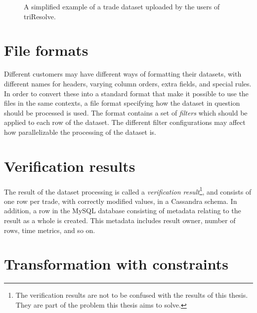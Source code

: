 \begin{figure}[ht]
\centering
{}
\caption[Example of trade dataset]{A simplified example of a trade dataset uploaded by the users of triResolve.}
  \label{fig:data_set_example}
\end{figure}

\section{File formats}
Different customers may have different ways of formatting their datasets, with different names for headers, varying column orders, extra fields,
and special rules. In order to convert these into a standard format that make it possible to use the files in the same contexts, a file format specifying
how the dataset in question should be processed is used. The format contains a set of \textit{filters} which should be applied to each row of the dataset.
The different filter configurations may affect how parallelizable the processing of the dataset is.

\section{Verification results}
The result of the dataset processing is called a \textit{verification result}\footnote{The verification results are not to be confused with the results of this thesis. They are part of the problem this thesis aims to solve.}, and consists of one row per trade, with correctly modified values, in a Cassandra schema.
In addition, a row in the MySQL database consisting of metadata relating to the result as a whole is created. This metadata includes result owner, number of rows, time metrics, and so on.

\section{Transformation with constraints}
